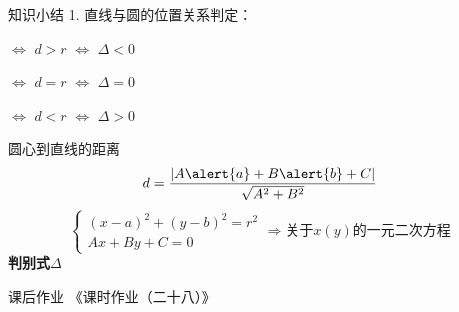 \documentclass[12pt]{beamer}
\begin{document}
\begin{frame}{知识小结}
	1. 直线与圆的位置关系判定：
	\begin{description}[<+- | alert@+>]
		\item[相离] $\Longleftrightarrow$ $d>r$ $\Longleftrightarrow$ $\Delta < 0$
		\item[相切] $\Longleftrightarrow$ $d=r$ $\Longleftrightarrow$ $\Delta = 0$
		\item[相交] $\Longleftrightarrow$ $d<r$ $\Longleftrightarrow$ $\Delta > 0$
	\end{description}\pause
	圆心到直线的距离\[ d= \frac{|A\alert{a}+B\alert{b}+C|}{\sqrt{A^2+B^2}} \]\pause
	\[\left\{ \begin{array}{l}
	(x-a)^2+(y-b)^2=r^2 \\
	Ax+By+C=0
	\end{array} \right.
	\Longrightarrow
	\textbf{关于$x(y)$的一元二次方程}\]
	\textbf{\alert{判别式$\Delta$}}
\end{frame}

\begin{frame}{课后作业}
	《课时作业（二十八）》
\end{frame}
\end{document}
